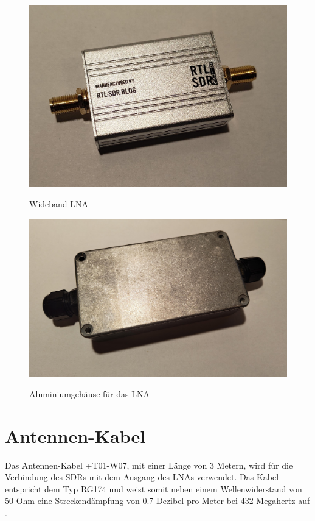 \begin{figure}[H]
	\begin{minipage}[b]{.4\linewidth}
		\includegraphics[width=\linewidth]{../ref/LNA.jpeg}
		\label{fig:LNA}
		\caption{Wideband LNA}
	\end{minipage}
	\hspace{.1\linewidth}%
	\begin{minipage}[b]{.4\linewidth} %
		\includegraphics[width=\linewidth]{../ref/LNA_Box.jpeg}
		\label{fig:lnabox}
		\caption{Aluminiumgehäuse für das LNA}
	\end{minipage}
\end{figure}

\section{Antennen-Kabel}
\label{sec:Antennen-Kabel-QFH}
Das Antennen-Kabel +T01-W07, mit einer Länge von 3 Metern, wird für die Verbindung des SDRs mit dem Ausgang des LNAs verwendet. Das Kabel entspricht dem Typ RG174 und weist somit neben einem Wellenwiderstand von 50 Ohm eine Streckendämpfung von 0.7 Dezibel pro Meter bei 432 Megahertz auf \cite{noauthor_dunnes_nodate}.

